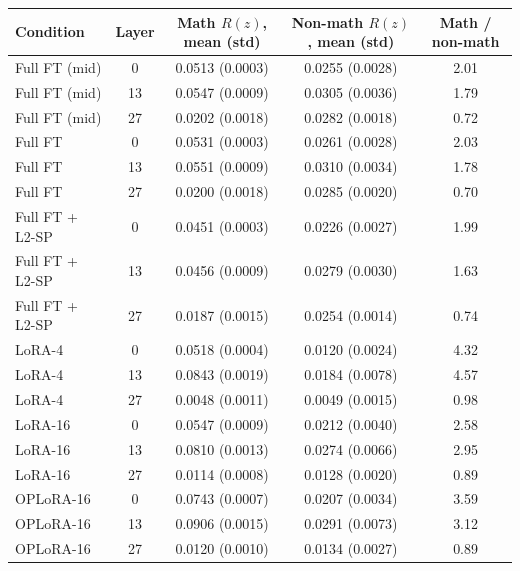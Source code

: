 \begin{tabular}{lcccc}
\toprule
Condition & Layer & Math $R(z)$, mean (std) & Non-math $R(z)$, mean (std) & Math / non-math \\
\midrule
Full FT (mid) & 0 & 0.0513 (0.0003) & 0.0255 (0.0028) & 2.01 \\
Full FT (mid) & 13 & 0.0547 (0.0009) & 0.0305 (0.0036) & 1.79 \\
Full FT (mid) & 27 & 0.0202 (0.0018) & 0.0282 (0.0018) & 0.72 \\
Full FT & 0 & 0.0531 (0.0003) & 0.0261 (0.0028) & 2.03 \\
Full FT & 13 & 0.0551 (0.0009) & 0.0310 (0.0034) & 1.78 \\
Full FT & 27 & 0.0200 (0.0018) & 0.0285 (0.0020) & 0.70 \\
Full FT + L2-SP & 0 & 0.0451 (0.0003) & 0.0226 (0.0027) & 1.99 \\
Full FT + L2-SP & 13 & 0.0456 (0.0009) & 0.0279 (0.0030) & 1.63 \\
Full FT + L2-SP & 27 & 0.0187 (0.0015) & 0.0254 (0.0014) & 0.74 \\
LoRA-4 & 0 & 0.0518 (0.0004) & 0.0120 (0.0024) & 4.32 \\
LoRA-4 & 13 & 0.0843 (0.0019) & 0.0184 (0.0078) & 4.57 \\
LoRA-4 & 27 & 0.0048 (0.0011) & 0.0049 (0.0015) & 0.98 \\
LoRA-16 & 0 & 0.0547 (0.0009) & 0.0212 (0.0040) & 2.58 \\
LoRA-16 & 13 & 0.0810 (0.0013) & 0.0274 (0.0066) & 2.95 \\
LoRA-16 & 27 & 0.0114 (0.0008) & 0.0128 (0.0020) & 0.89 \\
OPLoRA-16 & 0 & 0.0743 (0.0007) & 0.0207 (0.0034) & 3.59 \\
OPLoRA-16 & 13 & 0.0906 (0.0015) & 0.0291 (0.0073) & 3.12 \\
OPLoRA-16 & 27 & 0.0120 (0.0010) & 0.0134 (0.0027) & 0.89 \\
\bottomrule
\end{tabular}